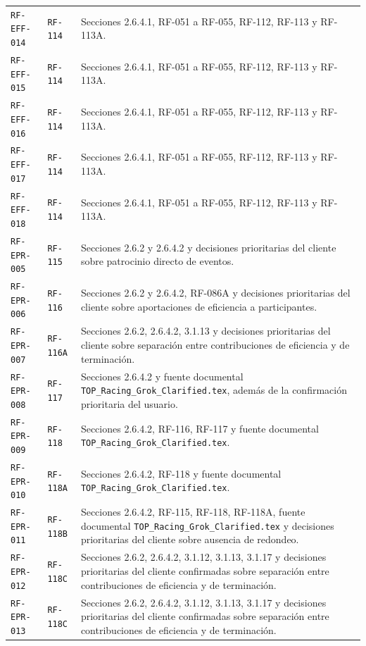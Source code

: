 \documentclass[10pt,letterpaper]{article}
\begin{document}
\begin{landscape}
\begin{longtable}{P{2.7cm}P{2.6cm}P{15.7cm}}
\texttt{RF-EFF-014} & \texttt{RF-114} & Secciones 2.6.4.1, RF-051 a RF-055, RF-112, RF-113 y RF-113A.\\
\texttt{RF-EFF-015} & \texttt{RF-114} & Secciones 2.6.4.1, RF-051 a RF-055, RF-112, RF-113 y RF-113A.\\
\texttt{RF-EFF-016} & \texttt{RF-114} & Secciones 2.6.4.1, RF-051 a RF-055, RF-112, RF-113 y RF-113A.\\
\texttt{RF-EFF-017} & \texttt{RF-114} & Secciones 2.6.4.1, RF-051 a RF-055, RF-112, RF-113 y RF-113A.\\
\texttt{RF-EFF-018} & \texttt{RF-114} & Secciones 2.6.4.1, RF-051 a RF-055, RF-112, RF-113 y RF-113A.\\
\texttt{RF-EPR-005} & \texttt{RF-115} & Secciones 2.6.2 y 2.6.4.2 y decisiones prioritarias del cliente sobre patrocinio directo de eventos.\\
\texttt{RF-EPR-006} & \texttt{RF-116} & Secciones 2.6.2 y 2.6.4.2, RF-086A y decisiones prioritarias del cliente sobre aportaciones de eficiencia a participantes.\\
\texttt{RF-EPR-007} & \texttt{RF-116A} & Secciones 2.6.2, 2.6.4.2, 3.1.13 y decisiones prioritarias del cliente sobre separación entre contribuciones de eficiencia y de terminación.\\
\texttt{RF-EPR-008} & \texttt{RF-117} & Secciones 2.6.4.2 y fuente documental \texttt{TOP\_Racing\_Grok\_Clarified.tex}, además de la confirmación prioritaria del usuario.\\
\texttt{RF-EPR-009} & \texttt{RF-118} & Secciones 2.6.4.2, RF-116, RF-117 y fuente documental \texttt{TOP\_Racing\_Grok\_Clarified.tex}.\\
\texttt{RF-EPR-010} & \texttt{RF-118A} & Secciones 2.6.4.2, RF-118 y fuente documental \texttt{TOP\_Racing\_Grok\_Clarified.tex}.\\
\texttt{RF-EPR-011} & \texttt{RF-118B} & Secciones 2.6.4.2, RF-115, RF-118, RF-118A, fuente documental \texttt{TOP\_Racing\_Grok\_Clarified.tex} y decisiones prioritarias del cliente sobre ausencia de redondeo.\\
\texttt{RF-EPR-012} & \texttt{RF-118C} & Secciones 2.6.2, 2.6.4.2, 3.1.12, 3.1.13, 3.1.17 y decisiones prioritarias del cliente confirmadas sobre separación entre contribuciones de eficiencia y de terminación.\\
\texttt{RF-EPR-013} & \texttt{RF-118C} & Secciones 2.6.2, 2.6.4.2, 3.1.12, 3.1.13, 3.1.17 y decisiones prioritarias del cliente confirmadas sobre separación entre contribuciones de eficiencia y de terminación.\\

\end{longtable}
\end{landscape}
\end{document}
